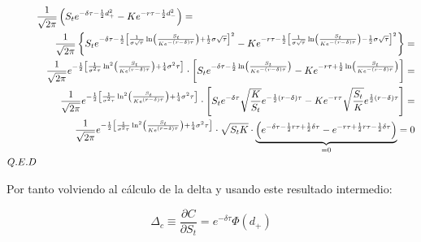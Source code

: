 \documentclass[12pt]{article}
\begin{document}
\begin{eqnarray*}
	\lefteqn{\frac{1}{\sqrt{2\pi}}\left(S_{t}e^{-\delta\tau-\frac{1}{2}d_{+}^{2}}-Ke^{-r\tau-\frac{1}{2}d_{-}^{2}}\right) =} \\
	  &  & \frac{1}{\sqrt{2\pi}}\left\{ S_{t}e^{-\delta\tau-\frac{1}{2}\left[\frac{1}{\sigma\sqrt{\tau}}\ln\left(\frac{S_{t}} 
	{Ke^{-\left(r-\delta\right)\tau}}\right)+\frac{1}{2}\sigma\sqrt{\tau}\right]^{2}} - 
	 Ke^{-r\tau-\frac{1}{2}\left[\frac{1}{\sigma\sqrt{\tau}}\ln\left(\frac{S_{t}}{Ke^{-\left(r-\delta\right)\tau}}
	\right)-\frac{1}{2}\sigma\sqrt{\tau}\right]^{2}}\right\} = \\
	  &  & \frac{1}{\sqrt{2\pi}}e^{-\frac{1}{2}\left[\frac{1}{\sigma^{2}\tau}\ln^{2}\left(\frac{S_{t}}{Ke^{\left(r-\delta\right)
	\tau}}\right) + \frac{1}{4}\sigma^{2}\tau\right]}\cdot\left[S_{t}e^{-\delta\tau-\frac{1}{2}\ln\left(\frac{S_{t}}
	{Ke^{-\left(r-\delta\right)\tau}}\right)}-
	Ke^{-r\tau+\frac{1}{2}\ln\left(\frac{S_{t}}{Ke^{-\left(r-\delta\right)\tau}}\right)}\right] = \\
	  &  & \frac{1}{\sqrt{2\pi}}e^{-\frac{1}{2}\left[\frac{1}{\sigma^{2}\tau}\ln^{2}\left(\frac{S_{t}}{Ke^{\left(r-\delta\right)
	\tau}}\right) + \frac{1}{4}\sigma^{2}\tau\right]}\cdot\left[S_{t}e^{-\delta\tau}\sqrt{\frac{K}{S_{t}}}e^{-\frac{1}{2}
	\left(r-\delta\right)\tau}-Ke^{-r\tau}\sqrt{\frac{S_{t}}{K}}e^{\frac{1}{2}\left(r-\delta\right)\tau}\right] = \\
	  &  & \frac{1}{\sqrt{2\pi}}e^{-\frac{1}{2}\left[\frac{1}{\sigma^{2}\tau}\ln^{2}\left(\frac{S_{t}}{Ke^{\left(r-\delta\right)
	\tau}}\right) + \frac{1}{4}\sigma^{2}\tau\right]}\cdot\sqrt{S_{t}K}\cdot
	\underbrace{\left(e^{-\delta\tau-\frac{1}{2}r\tau+\frac{1}{2}
	\delta\tau}-e^{-r\tau+\frac{1}{2}r\tau-\frac{1}{2}\delta\tau}\right)}_{=0} = 0 \\
	Q.E.D
\end{eqnarray*}
\newline

Por tanto volviendo al c\'{a}lculo de la delta y usando este resultado intermedio:
\newline

\begin{equation}
	\Delta_{c}\equiv\frac{\partial C}{\partial S_{t}} = e^{-\delta\tau}\Phi\left(d_{+}\right)
\end{equation}
\end{document}
